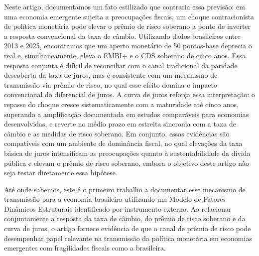 \documentclass[preprint,authoryear,review,12pt]{elsarticle}
\begin{document}
Neste artigo, documentamos um fato estilizado que contraria essa previsão: em uma economia emergente sujeita a preocupações fiscais, um choque contracionista de política monetária pode elevar o prêmio de risco soberano a ponto de inverter a resposta convencional da taxa de câmbio. Utilizando dados brasileiros entre 2013 e 2025, encontramos que um aperto monetário de 50 pontos-base deprecia o real e, simultaneamente, eleva o EMBI+ e o CDS soberano de cinco anos. Essa resposta conjunta é difícil de reconciliar com o canal tradicional da paridade descoberta da taxa de juros, mas é consistente com um mecanismo de transmissão via prêmio de risco, no qual esse efeito domina o impacto convencional do diferencial de juros. A curva de juros reforça essa interpretação: o repasse do choque cresce sistematicamente com a maturidade até cinco anos, superando a amplificação documentada em estudos comparáveis para economias desenvolvidas, e reverte no médio prazo em estreita sincronia com a taxa de câmbio e as medidas de risco soberano. Em conjunto, essas evidências são compatíveis com um ambiente de dominância fiscal, no qual elevações da taxa básica de juros intensificam as preocupações quanto à sustentabilidade da dívida pública e elevam o prêmio de risco soberano, embora o objetivo deste artigo não seja testar diretamente essa hipótese.


Até onde sabemos, este é o primeiro trabalho a documentar esse mecanismo de transmissão para a economia brasileira utilizando um Modelo de Fatores Dinâmicos Estruturais identificado por instrumento externo. Ao relacionar conjuntamente a resposta da taxa de câmbio, do prêmio de risco soberano e da curva de juros, o artigo fornece evidência de que o canal de prêmio de risco pode desempenhar papel relevante na transmissão da política monetária em economias emergentes com fragilidades fiscais como a brasileira.
\end{document}
